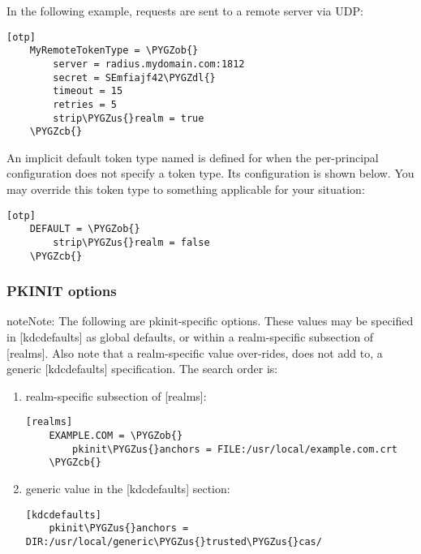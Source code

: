 \documentclass[letterpaper,10pt,english]{sphinxmanual}
\def\PYGZus{\char`\_}
\def\PYGZob{\char`\{}
\def\PYGZcb{\char`\}}
\def\PYGZdl{\char`\$}
\begin{document}
In the following example, requests are sent to a remote server via UDP:

\begin{Verbatim}[commandchars=\\\{\}]
[otp]
    MyRemoteTokenType = \PYGZob{}
        server = radius.mydomain.com:1812
        secret = SEmfiajf42\PYGZdl{}
        timeout = 15
        retries = 5
        strip\PYGZus{}realm = true
    \PYGZcb{}
\end{Verbatim}

An implicit default token type named  is defined for when
the per-principal configuration does not specify a token type.  Its
configuration is shown below.  You may override this token type to
something applicable for your situation:

\begin{Verbatim}[commandchars=\\\{\}]
[otp]
    DEFAULT = \PYGZob{}
        strip\PYGZus{}realm = false
    \PYGZcb{}
\end{Verbatim}


\subsubsection{PKINIT options}
\label{admin/conf_files/kdc_conf:pkinit-options}
\begin{notice}{note}{Note:}
The following are pkinit-specific options.  These values may
be specified in {[}kdcdefaults{]} as global defaults, or within
a realm-specific subsection of {[}realms{]}.  Also note that a
realm-specific value over-rides, does not add to, a generic
{[}kdcdefaults{]} specification.  The search order is:
\end{notice}
\begin{enumerate}
\item {} 
realm-specific subsection of {[}realms{]}:

\begin{Verbatim}[commandchars=\\\{\}]
[realms]
    EXAMPLE.COM = \PYGZob{}
        pkinit\PYGZus{}anchors = FILE:/usr/local/example.com.crt
    \PYGZcb{}
\end{Verbatim}

\item {} 
generic value in the {[}kdcdefaults{]} section:

\begin{Verbatim}[commandchars=\\\{\}]
[kdcdefaults]
    pkinit\PYGZus{}anchors = DIR:/usr/local/generic\PYGZus{}trusted\PYGZus{}cas/
\end{Verbatim}

\end{enumerate}
\end{document}
